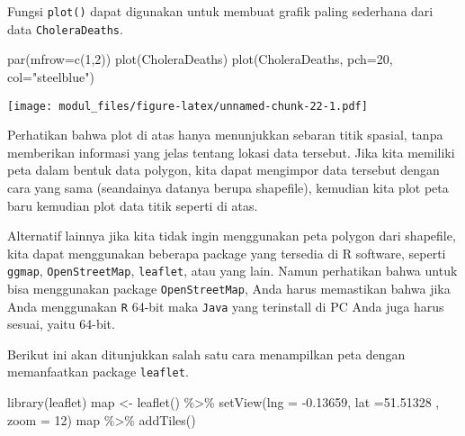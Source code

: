 \documentclass[
]{book}
\newenvironment{Shaded}{\begin{snugshade}}{\end{snugshade}}
\newcommand{\AttributeTok}[1]{\textcolor[rgb]{0.77,0.63,0.00}{#1}}
\newcommand{\DecValTok}[1]{\textcolor[rgb]{0.00,0.00,0.81}{#1}}
\newcommand{\FloatTok}[1]{\textcolor[rgb]{0.00,0.00,0.81}{#1}}
\newcommand{\FunctionTok}[1]{\textcolor[rgb]{0.00,0.00,0.00}{#1}}
\newcommand{\NormalTok}[1]{#1}
\newcommand{\OtherTok}[1]{\textcolor[rgb]{0.56,0.35,0.01}{#1}}
\newcommand{\SpecialCharTok}[1]{\textcolor[rgb]{0.00,0.00,0.00}{#1}}
\newcommand{\StringTok}[1]{\textcolor[rgb]{0.31,0.60,0.02}{#1}}
\begin{document}
Fungsi \texttt{plot()} dapat digunakan untuk membuat grafik paling sederhana dari data \texttt{CholeraDeaths}.

\begin{Shaded}
\begin{Highlighting}[]
\FunctionTok{par}\NormalTok{(}\AttributeTok{mfrow=}\FunctionTok{c}\NormalTok{(}\DecValTok{1}\NormalTok{,}\DecValTok{2}\NormalTok{))}
\FunctionTok{plot}\NormalTok{(CholeraDeaths)}
\FunctionTok{plot}\NormalTok{(CholeraDeaths, }\AttributeTok{pch=}\DecValTok{20}\NormalTok{, }\AttributeTok{col=}\StringTok{"steelblue"}\NormalTok{)}
\end{Highlighting}
\end{Shaded}

\texttt{[image: modul\_files/figure-latex/unnamed-chunk-22-1.pdf]}

Perhatikan bahwa plot di atas hanya menunjukkan sebaran titik spasial, tanpa memberikan informasi yang jelas tentang lokasi data tersebut. Jika kita memiliki peta dalam bentuk data polygon, kita dapat mengimpor data tersebut dengan cara yang sama (seandainya datanya berupa shapefile), kemudian kita plot peta baru kemudian plot data titik seperti di atas.

Alternatif lainnya jika kita tidak ingin menggunakan peta polygon dari shapefile, kita dapat menggunakan beberapa package yang tersedia di R software, seperti \texttt{ggmap}, \texttt{OpenStreetMap}, \texttt{leaflet}, atau yang lain. Namun perhatikan bahwa untuk bisa menggunakan package \texttt{OpenStreetMap}, Anda harus memastikan bahwa jika Anda menggunakan \texttt{R} 64-bit maka \texttt{Java} yang terinstall di PC Anda juga harus sesuai, yaitu 64-bit.

Berikut ini akan ditunjukkan salah satu cara menampilkan peta dengan memanfaatkan package \texttt{leaflet}.

\begin{Shaded}
\begin{Highlighting}[]
\FunctionTok{library}\NormalTok{(leaflet)}
\NormalTok{map }\OtherTok{\textless{}{-}} \FunctionTok{leaflet}\NormalTok{() }\SpecialCharTok{\%\textgreater{}\%} \FunctionTok{setView}\NormalTok{(}\AttributeTok{lng =}  \SpecialCharTok{{-}}\FloatTok{0.13659}\NormalTok{, }\AttributeTok{lat =}\FloatTok{51.51328}\NormalTok{ , }\AttributeTok{zoom =} \DecValTok{12}\NormalTok{)}
\NormalTok{map }\SpecialCharTok{\%\textgreater{}\%} \FunctionTok{addTiles}\NormalTok{() }
\end{Highlighting}
\end{Shaded}
\end{document}
